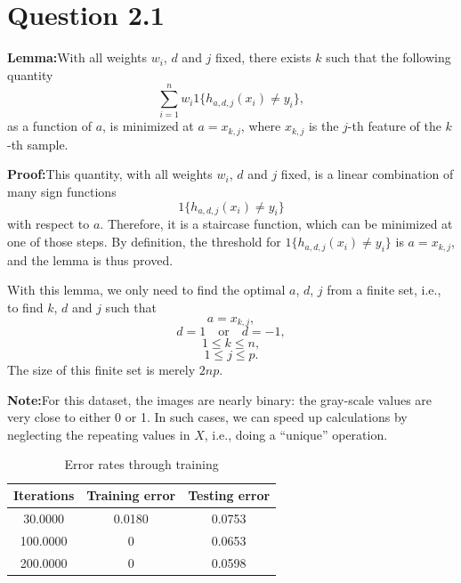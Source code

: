 \documentclass{article}
\begin{document}
\section*{Question 2.1}
{
    \textbf{Lemma:}\quad With all weights $w_i$, $d$ and $j$ fixed, there exists $k$ such that the following quantity
    $$\sum_{i=1}^{n}{w_i 1\{ h_{a,d,j}(x_i) \neq y_i \}},$$ as a function of $a$, 
    is minimized at $a = x_{k,j}$, where $x_{k,j}$ is the $j$-th feature of the $k$-th sample.

    \textbf{Proof:}\quad This quantity, with all weights $w_i$, $d$ and $j$ fixed, is a linear combination of many sign functions $$1\{ h_{a,d,j}(x_i) \neq y_i \} $$ with respect to $a$. Therefore, it is a staircase function, which can be minimized at one of those steps. By definition, the threshold for $1\{ h_{a,d,j}(x_i) \neq y_i \} $ is $a = x_{k,j}$, and the lemma is thus proved.

    With this lemma, we only need to find the optimal $a$, $d$, $j$ from a finite set, i.e., to find $k$, $d$ and $j$ such that 
    $$a = x_{k,j} ,$$
    $$d = 1 \mathrm{\quad or\quad } d = -1 ,$$
    $$1 \leq k \leq n ,$$
    $$1 \leq j \leq p.$$
    The size of this finite set is merely $2np$.

    \textbf{Note:}\quad For this dataset, the images are nearly binary: the gray-scale values are very close to either 0 or 1. In such cases, we can speed up calculations by neglecting the repeating values in $X$, i.e., doing a ``unique'' operation. 

    \begin{table}[!hbp]
        \centering
        \begin{tabular}{|c|c|c|}
        \hline
        Iterations & Training error & Testing error \\
        \hline
        30.0000  &  0.0180  &  0.0753 \\
        \hline
        100.0000    &     0  &  0.0653 \\
        \hline
        200.0000   &      0  &  0.0598 \\
        \hline
        \end{tabular}
        \caption{Error rates through training}
    \end{table}

}
\end{document}
